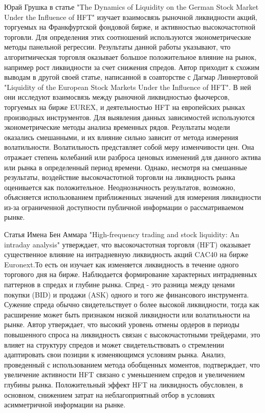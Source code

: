 \documentclass{letask}
\begin{document}
Юрай Грушка в статье "The Dynamics of Liquidity on the German Stock Market Under the Influence of HFT" изучает взаимосвязь рыночной ликвидности акций, торгуемых на Франкфуртской фондовой бирже, и активностью высокочастотной торговли. Для определения этих соотношений используются эконометрические методы панельной регрессии. Результаты данной работы указывают, что алгоритмическая торговля оказывает большое положительное влияние на рынок, например рост ликвидности за счет снижения спредов. Автор приходит к схожим выводам в другой своей статье, написанной в соавторстве с Дагмар Линнертовой "Liquidity of the European Stock Markets Under the Influence of HFT". В ней они исследуют взаимосвязь между рыночной ликвидностью фьючерсов, торгуемых на бирже EUREX, и деятельностью HFT на европейских рынках производных инструментов. Для выявления данных зависимостей используются эконометрические методы анализа временных рядов. Результаты модели оказались смешанными, и их влияние сильно зависит от метода измерения волатильности. Волатильность представляет собой меру изменчивости цен. Она отражает степень колебаний или разброса ценовых изменений для данного актива или рынка в определенный период времени. Однако, несмотря на смешанные результаты, воздействие высокочастотной торговли на ликвидность рынка оценивается как положительное. Неоднозначность результатов, возможно, объясняется использованием приближенных значений для измерения ликвидности из-за ограниченной доступности публичной информации о рассматриваемом рынке.

Статья Имена Бен Аммара "High-frequency trading and stock liquidity: An intraday analysis" утверждает, что высокочастотная торговля (HFT) оказывает существенное влияние на интрадневную ликвидность акций CAC40 на бирже Euronext.То есть он изучает как изменяется ликвидность в течение одного торгового дня на бирже. Наблюдается формирование характерных интрадневных паттернов в спредах и глубине рынка. Спред - это разница между ценами покупки (BID) и продажи (ASK) одного и того же финансового инструмента. Сужение спреда обычно свидетельствует о более высокой ликвидности, тогда как расширение может быть признаком низкой ликвидности или волатильности на рынке. Автор утверждает, что высокий уровень отмены ордеров в периоды повышенного спроса на ликвидность связан с высокочастотными трейдерами, это влияет на структуру спредов и может свидетельствовать о стремлении адаптировать свои позиции к изменяющимся условиям рынка. Анализ, проведенный с использованием метода обобщенных моментов, подтверждает, что увеличение активности HFT связано с уменьшением спредов и увеличением глубины рынка. Положительный эффект HFT на ликвидность обусловлен, в основном, снижением затрат на неблагоприятный отбор в условиях асимметричной информации на рынке.
\end{document}

